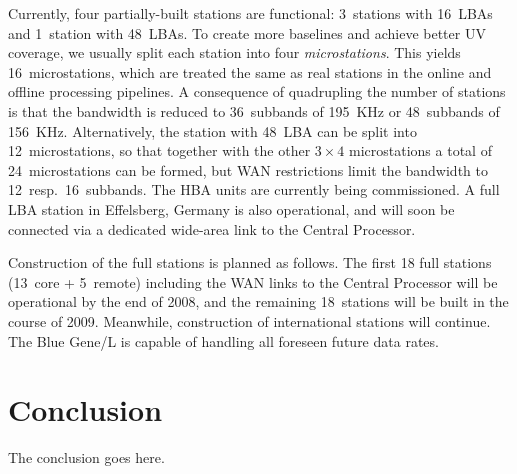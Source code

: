 \documentclass[journal]{IEEEtran}
\begin{document}
Currently, four partially-built stations are functional: 3~stations with
16~LBAs and 1~station with 48~LBAs.
To create more baselines and achieve better UV coverage, we usually split each
station into four {\em microstations}.
This yields 16~microstations, which are treated the same as real stations in
the online and offline processing pipelines.
A consequence of quadrupling the number of stations is that the bandwidth
is reduced to 36~subbands of 195~KHz or 48~subbands of 156~KHz.
Alternatively, the station with 48~LBA can be split into 12~microstations,
so that together with the other $3\times4$ microstations a total of
24~microstations can be formed,
but WAN restrictions limit the bandwidth to 12~resp.\ 16~subbands.
The HBA units are currently being commissioned.
A full LBA station in Effelsberg, Germany is also operational, and will soon
be connected via a dedicated wide-area link to the Central Processor.

Construction of the full stations is planned as follows.
The first 18 full stations (13~core + 5~remote) 
including the WAN links to the Central Processor will be operational by the
end of 2008, and the remaining 18~stations will be built in the course of 2009.
Meanwhile, construction of international stations will continue.
The Blue Gene/L is capable of handling all foreseen future data rates.


\section{Conclusion}
The conclusion goes here.





\end{document}
